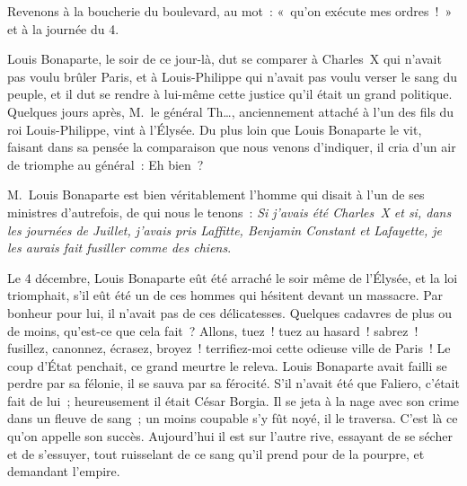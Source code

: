 \documentclass[french,twoside]{book} %
\begin{document}
\noindent Revenons à la boucherie du boulevard, au mot : « qu’on exécute mes ordres ! » et à la journée du 4.\par
Louis Bonaparte, le soir de ce jour-là, dut se comparer à Charles X qui n’avait pas voulu brûler Paris, et à Louis-Philippe qui n’avait pas voulu verser le sang du peuple, et il dut se rendre à lui-même cette justice qu’il était un grand politique. Quelques jours après, M. le général Th…, anciennement attaché à l’un des fils du roi Louis-Philippe, vint à l’Élysée. Du plus loin que Louis Bonaparte le vit, faisant dans sa pensée la comparaison que nous venons d’indiquer, il cria d’un air de triomphe au général : Eh bien ?\par
M. Louis Bonaparte est bien véritablement l’homme qui disait à l’un de ses ministres d’autrefois, de qui nous le tenons : \emph{Si j’avais été Charles X et si, dans les journées de Juillet, j’avais pris Laffitte, Benjamin Constant et Lafayette, je les aurais fait fusiller comme des chiens}.\par
Le 4 décembre, Louis Bonaparte eût été arraché le soir même de l’Élysée, et la loi triomphait, s’il eût été un de ces hommes qui hésitent devant un massacre. Par bonheur pour lui, il n’avait pas de ces délicatesses. Quelques cadavres de plus ou de moins, qu’est-ce que cela fait ? Allons, tuez ! tuez au hasard ! sabrez ! fusillez, canonnez, écrasez, broyez ! terrifiez-moi cette odieuse ville de Paris ! Le coup d’État penchait, ce grand meurtre le releva. Louis Bonaparte avait failli se perdre par sa félonie, il se sauva par sa férocité. S’il n’avait été que Faliero, c’était fait de lui ; heureusement il était César Borgia. Il se jeta à la nage avec son crime dans un fleuve de sang ; un moins coupable s’y fût noyé, il le traversa. C’est là ce qu’on appelle son succès. Aujourd’hui il est sur l’autre rive, essayant de se sécher et de s’essuyer, tout ruisselant de ce sang qu’il prend pour de la pourpre, et demandant l’empire.
\end{document}

